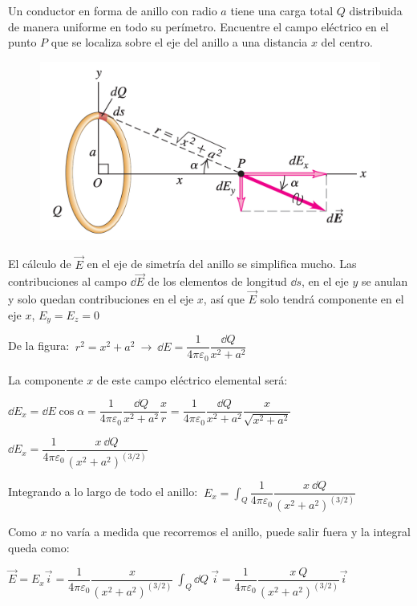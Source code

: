 \begin{prob}
Un conductor en forma de anillo con radio $a$ tiene una carga total $Q$ distribuida de manera uniforme en todo su perímetro. Encuentre el campo eléctrico en el punto $P$ que se localiza sobre el eje del anillo a una distancia $x$ del centro.	
\begin{figure}[H]
	\centering
	\includegraphics[width=.9\textwidth]{imagenes/imagenes22/T22IM21.png}
\end{figure}
\end{prob}
El cálculo de $\vec E$ en el eje de simetría del anillo se simplifica mucho. Las contribuciones al campo $\dd \vec E$ de los elementos de longitud $\dd s$, en el eje $y$ se anulan y solo quedan contribuciones en el eje $x$, así que $\vec E$ solo tendrá componente en el eje $x$, $E_y=E_z=0$

De la figura: $\ r^2=x^2+a^2 \ \to \ \dd E=\dfrac{1}{4\pi \varepsilon_0} \dfrac{\dd Q}{x^2+a^2}$

La componente $x$ de este campo eléctrico elemental será:

$\dd E_x=\dd E \cos \alpha = \dfrac{1}{4\pi \varepsilon_0} \dfrac{\dd Q}{x^2+a^2} \dfrac x r =\dfrac{1}{4\pi \varepsilon_0} \dfrac{\dd Q}{x^2+a^2} \dfrac {x} {\sqrt{x^2+a^2}} $

$\dd E_x=\dfrac{1}{4\pi \varepsilon_0} \dfrac{x\ \dd Q}{(x^2+a^2)^{(3/2)}}$

Integrando a lo largo de todo el anillo: $\ E_x=\displaystyle \int_Q \dfrac{1}{4\pi \varepsilon_0} \dfrac{x\ \dd Q}{(x^2+a^2)^{(3/2)}}$  

Como $x$ no varía a medida que recorremos el anillo, puede salir fuera y la integral queda como:

$\vec E = E_x \vec i=\displaystyle  \dfrac{1}{4\pi \varepsilon_0} \dfrac{x}{(x^2+a^2)^{(3/2)}} \ \int_Q \dd Q  \ \vec i = 
 \dfrac{1}{4\pi \varepsilon_0} \dfrac{x\ Q}{(x^2+a^2)^{(3/2)}} \vec i$ 
 
